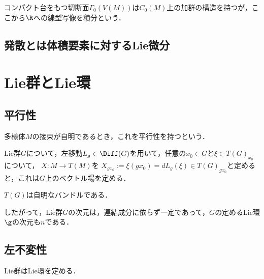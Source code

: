 \documentclass[uplatex,dvipdfmx]{jsreport}
\begin{document}
\begin{definition}
    コンパクト台をもつ切断面$\Gamma_0(V(M))$は$C_0(M)$上の加群の構造を持つが，ここから$\R$への線型写像を積分という．
\end{definition}

\subsection{発散とは体積要素に対するLie微分}

\section{Lie群とLie環}

\subsection{平行性}

\begin{tcolorbox}[colframe=ForestGreen, colback=ForestGreen!10!white,breakable,colbacktitle=ForestGreen!40!white,coltitle=black,fonttitle=\bfseries\sffamily,
title=]
    多様体$M$の接束が自明であるとき，これを平行性を持つという．
\end{tcolorbox}

\begin{lemma}
    Lie群$G$について，左移動$L_g\in\Diff(G)$を用いて，任意の$x_0\in G$と$\xi\in T(G)_{x_0}$について，
    $X:M\to T(M)$を
    $X_{gx_0}:=\xi(gx_0)=dL_g(\xi)\in T(G)_{gx_0}$と定めると，これは$G$上のベクトル場を定める．
\end{lemma}

\begin{corollary}
    $T(G)$は自明なバンドルである．
\end{corollary}

\begin{definition}
    したがって，Lie群$G$の次元は，連結成分に依らず一定であって，$G$の定めるLie環$\g$の次元も$n$である．
\end{definition}

\subsection{左不変性}

\begin{tcolorbox}[colframe=ForestGreen, colback=ForestGreen!10!white,breakable,colbacktitle=ForestGreen!40!white,coltitle=black,fonttitle=\bfseries\sffamily,
title=]
    Lie群はLie環を定める．
\end{tcolorbox}
\end{document}
